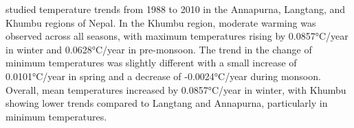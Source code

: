 \textcite{adhikari_x_2016} studied temperature trends from 1988 to 2010 in the Annapurna, Langtang, and Khumbu regions of Nepal. In the Khumbu region, moderate warming was observed across all seasons, with maximum temperatures rising by 0.0857°C/year in winter and 0.0628°C/year in pre-monsoon. The trend in the change of minimum temperatures was slightly different with a small increase of 0.0101°C/year in spring and a decrease of -0.0024°C/year during monsoon. Overall, mean temperatures increased by 0.0857°C/year in winter, with Khumbu showing lower trends compared to Langtang and Annapurna, particularly in minimum temperatures.

